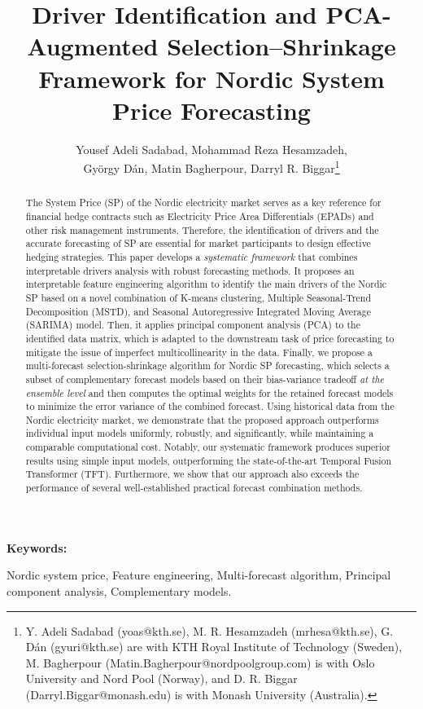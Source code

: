\documentclass{article}
\title{Driver Identification and PCA-Augmented Selection–Shrinkage Framework for Nordic System Price Forecasting}
\author{Yousef Adeli Sadabad, Mohammad Reza Hesamzadeh,\\ György Dán, Matin Bagherpour, Darryl R. Biggar\footnote{Y. Adeli Sadabad (yoas@kth.se), M. R. Hesamzadeh (mrhesa@kth.se), G. Dán (gyuri@kth.se) are with KTH Royal Institute of Technology (Sweden), M. Bagherpour (Matin.Bagherpour@nordpoolgroup.com) is with Oslo University and Nord Pool (Norway), and D. R. Biggar (Darryl.Biggar@monash.edu) is with Monash University (Australia).}}
\date{}
\newenvironment{keyword}
{\par\noindent\textbf{Keywords:}}
{\par}
\begin{document}
\maketitle

\begin{abstract}
The System Price (SP) of the Nordic electricity market serves as a key reference for financial hedge contracts such as Electricity Price Area Differentials (EPADs) and other risk management instruments. Therefore, the identification of drivers and the accurate forecasting of SP are essential for market participants to design effective hedging strategies. This paper develops a \textit{systematic framework} that combines interpretable drivers analysis with robust forecasting methods. It proposes an interpretable feature engineering algorithm to identify the main drivers of the Nordic SP based on a novel combination of K-means clustering, Multiple Seasonal-Trend Decomposition (MSTD), and Seasonal Autoregressive Integrated Moving Average (SARIMA) model. Then, it applies principal component analysis (PCA) to the identified data matrix, which is adapted to
the downstream task of price forecasting to mitigate the issue of imperfect multicollinearity in the data. Finally, we propose a multi-forecast selection-shrinkage algorithm for Nordic SP forecasting, which selects a subset of complementary forecast models based on their bias-variance tradeoff \textit{at the ensemble level} and then computes the optimal weights for the retained forecast models to minimize the error variance of the combined forecast. Using historical data from the Nordic electricity market, we demonstrate that the proposed approach outperforms individual input models uniformly, robustly, and significantly, while maintaining a comparable computational cost. Notably, our systematic framework produces superior results using simple input models, outperforming the state-of-the-art Temporal Fusion Transformer (TFT). Furthermore, we show that our approach also exceeds the performance of several well-established practical forecast combination methods. 
\end{abstract}

\begin{keyword}

Nordic system price, Feature engineering, Multi-forecast algorithm, Principal component analysis, Complementary models. 

\end{keyword}
\end{document}
